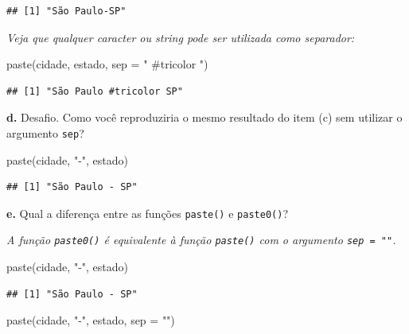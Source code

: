 \documentclass[
]{book}
\newenvironment{Shaded}{\begin{snugshade}}{\end{snugshade}}
\newcommand{\AttributeTok}[1]{\textcolor[rgb]{0.77,0.63,0.00}{#1}}
\newcommand{\FunctionTok}[1]{\textcolor[rgb]{0.00,0.00,0.00}{#1}}
\newcommand{\NormalTok}[1]{#1}
\newcommand{\StringTok}[1]{\textcolor[rgb]{0.31,0.60,0.02}{#1}}
\begin{document}
\begin{verbatim}
## [1] "São Paulo-SP"
\end{verbatim}

\emph{Veja que qualquer caracter ou string pode ser utilizada como separador:}

\begin{Shaded}
\begin{Highlighting}[]
\FunctionTok{paste}\NormalTok{(cidade, estado, }\AttributeTok{sep =} \StringTok{" \#tricolor "}\NormalTok{)}
\end{Highlighting}
\end{Shaded}

\begin{verbatim}
## [1] "São Paulo #tricolor SP"
\end{verbatim}

\textbf{d.} Desafio. Como você reproduziria o mesmo resultado do item (c) sem utilizar o argumento \texttt{sep}?

\begin{Shaded}
\begin{Highlighting}[]
\FunctionTok{paste}\NormalTok{(cidade, }\StringTok{"{-}"}\NormalTok{, estado)}
\end{Highlighting}
\end{Shaded}

\begin{verbatim}
## [1] "São Paulo - SP"
\end{verbatim}

\textbf{e.} Qual a diferença entre as funções \texttt{paste()} e \texttt{paste0()}?

\emph{A função \texttt{paste0()} é equivalente à função \texttt{paste()} com o argumento \texttt{sep\ =\ ""}.}

\begin{Shaded}
\begin{Highlighting}[]
\FunctionTok{paste}\NormalTok{(cidade, }\StringTok{"{-}"}\NormalTok{, estado)}
\end{Highlighting}
\end{Shaded}

\begin{verbatim}
## [1] "São Paulo - SP"
\end{verbatim}

\begin{Shaded}
\begin{Highlighting}[]
\FunctionTok{paste}\NormalTok{(cidade, }\StringTok{"{-}"}\NormalTok{, estado, }\AttributeTok{sep =} \StringTok{""}\NormalTok{)}
\end{Highlighting}
\end{Shaded}
\end{document}
